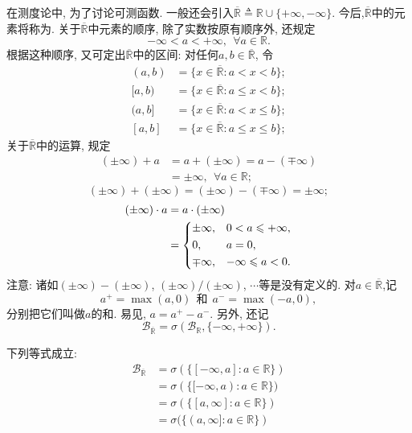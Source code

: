 在测度论中, 为了讨论可测函数. 一般还会引入$\overline{\mathbb{R}}\triangleq \mathbb{R}\cup\{+\infty,-\infty\}$. 今后,$\overline{\mathbb{R}}$中的元素将称为. 关于$\overline{\mathbb{R}}$中元素的顺序, 除了实数按原有顺序外, 还规定
\begin{equation}
	-\infty<a<+\infty,~~\forall a\in\mathbb{R}.
\end{equation}
根据这种顺序, 又可定出$\overline{\mathbb{R}}$中的区间: 对任何$a,b\in\overline{\mathbb{R}}$, 令
\begin{align}
	(a,b) &= \{x\in\overline{\mathbb{R}}:a<x<b\};\nonumber\\
	[a,b) &= \{x\in\overline{\mathbb{R}}:a\leqslant x<b\};\nonumber\\
	(a,b] &= \{x\in\overline{\mathbb{R}}:a<x\leqslant b\};\nonumber\\
	[a,b] &= \{x\in\overline{\mathbb{R}}:a\leqslant x\leqslant b\};
\end{align}
关于$\overline{\mathbb{R}}$中的运算, 规定
\begin{align}
	(\pm\infty)+a &= a+(\pm\infty) = a-(\mp\infty)\nonumber\\
	&= \pm\infty,~~\forall a\in\mathbb{R};
\end{align}
\begin{equation}
	(\pm\infty) + (\pm\infty) = (\pm\infty) - (\mp\infty) = \pm\infty;
\end{equation}
\begin{align}
(\pm\infty)\cdot a &= a\cdot(\pm\infty) \nonumber\\
&= \begin{dcases}
	\pm\infty,&0<a\leqslant +\infty,\\
	0,&a=0,\\
	\mp\infty,&-\infty\leqslant a<0.
\end{dcases}
\end{align}
注意: 诸如$(\pm\infty)-(\pm\infty)$, $(\pm\infty)/(\pm\infty)$, $\cdots$等是没有定义的. 对$a\in\overline{\mathbb{R}}$,记
\begin{equation}
	a^+ = \max(a,0)~~\text{和}~~a^- = \max(-a,0),
\end{equation}
分别把它们叫做$a$的和. 易见, $a = a^+ - a^-$. 另外, 还记
\begin{equation}
	\mathscr{B}_{\overline{\mathbb{R}}} = \sigma(\mathscr{B}_{\mathbb{R}},\{-\infty,+\infty\}).
\end{equation}

\begin{theorem}
	下列等式成立:
	\begin{align}
		\mathscr{B}_{\overline{\mathbb{R}}} &= \sigma(\{ [-\infty,a]:a\in\mathbb{R} \})\nonumber\\
		&= \sigma(\{ [-\infty,a):a\in\mathbb{R} \})\nonumber\\
		&= \sigma(\{ [a,\infty]:a\in\mathbb{R} \})\nonumber\\
		&= \sigma(\{ (a,\infty]:a\in\mathbb{R} \})
	\end{align}
\end{theorem}

